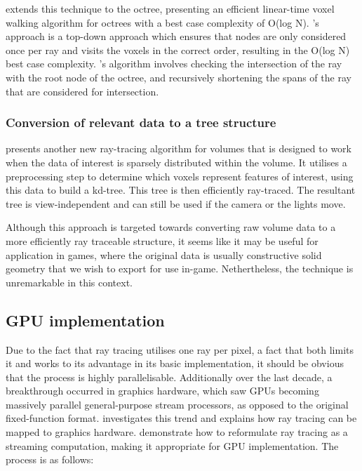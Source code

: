 \cite{arvo88octreewalking} extends this technique to the octree, presenting an efficient linear-time voxel walking algorithm for octrees with a best case complexity of O(log N). \citeauthor{arvo88octreewalking}'s approach is a top-down approach which ensures that nodes are only considered once per ray and visits the voxels in the correct order, resulting in the O(log N) best case complexity. \citeauthor{arvo88octreewalking}'s algorithm involves checking the intersection of the ray with the root node of the octree, and recursively shortening the spans of the ray that are considered for intersection.

\subsubsection{Conversion of relevant data to a tree structure}
\cite{subramanian90applying} presents another new ray-tracing algorithm for volumes that is designed to work when the data of interest is sparsely distributed within the volume. It utilises a preprocessing step to determine which voxels represent features of interest, using this data to build a kd-tree. This tree is then efficiently ray-traced. The resultant tree is view-independent and can still be used if the camera or the lights move.

Although this approach is targeted towards converting raw volume data to a more efficiently ray traceable structure, it seems like it may be useful for application in games, where the original data is usually constructive solid geometry that we wish to export for use in-game. Nethertheless, the technique is unremarkable in this context.

\subsection{GPU implementation}
Due to the fact that ray tracing utilises one ray per pixel, a fact that both limits it and works to its advantage in its basic implementation, it should be obvious that the process is highly parallelisable. Additionally over the last decade, a breakthrough occurred in graphics hardware, which saw GPUs becoming massively parallel general-purpose stream processors, as opposed to the original fixed-function format. \cite{purcell02gpuraytracing} investigates this trend and explains how ray tracing can be mapped to graphics hardware. \citeauthor{purcell02gpuraytracing} demonstrate how to reformulate ray tracing as a streaming computation, making it appropriate for GPU implementation. The process is as follows:

